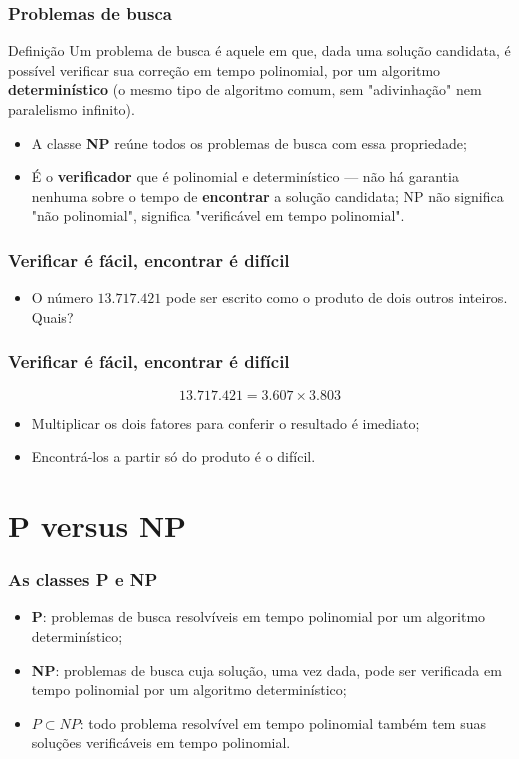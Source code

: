 \documentclass[fleqn]{beamer}
\begin{document}
\begin{frame}
	\frametitle{Problemas de busca}
	\begin{block}{Definição}
		Um problema de busca é aquele em que, dada uma solução candidata,
		é possível verificar sua correção em tempo polinomial, por um
		algoritmo \textbf{determinístico} (o mesmo tipo de algoritmo comum,
		sem "adivinhação" nem paralelismo infinito).
	\end{block}
	\begin{itemize}
		\item A classe \textbf{NP} reúne todos os problemas de busca com
			essa propriedade;
		\item É o \textbf{verificador} que é polinomial e determinístico —
			não há garantia nenhuma sobre o tempo de \textbf{encontrar} a
			solução candidata; NP não significa "não polinomial", significa
			"verificável em tempo polinomial".
	\end{itemize}
\end{frame}

\begin{frame}
	\frametitle{Verificar é fácil, encontrar é difícil}
	\begin{itemize}
		\item O número $13.717.421$ pode ser escrito como o produto de
			dois outros inteiros. Quais?
	\end{itemize}
\end{frame}

\begin{frame}
	\frametitle{Verificar é fácil, encontrar é difícil}
	$$
		13.717.421 = 3.607 \times 3.803
	$$
	\begin{itemize}
		\item Multiplicar os dois fatores para conferir o resultado é
			imediato;
		\item Encontrá-los a partir só do produto é o difícil.
	\end{itemize}
\end{frame}

\section{P versus NP}

\begin{frame}
	\frametitle{As classes P e NP}
	\begin{itemize}
		\item \textbf{P}: problemas de busca resolvíveis em tempo
			polinomial por um algoritmo determinístico;
		\item \textbf{NP}: problemas de busca cuja solução, uma vez dada,
			pode ser verificada em tempo polinomial por um algoritmo
			determinístico;
		\item $P \subset NP$: todo problema resolvível em tempo polinomial
			também tem suas soluções verificáveis em tempo polinomial.
	\end{itemize}
\end{frame}
\end{document}
